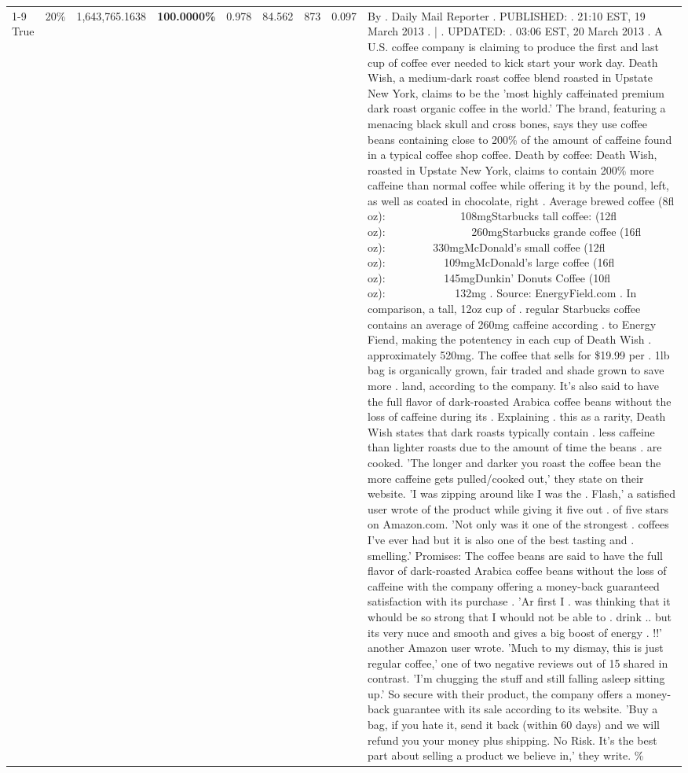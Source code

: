 \begin{table}[H]
{\begin{tabular}{lllrlllll}
\cline{1-9} \cline{2-9}
True & 20\% & 1,643,765.1638 & \bfseries \color{red} 100.0000\% & 0.978 & 84.562 & 873 & 0.097 & By . Daily Mail Reporter . PUBLISHED: . 21:10 EST, 19 March 2013 . | . UPDATED: . 03:06 EST, 20 March 2013 . A U.S. coffee company is claiming to produce the first and last cup of coffee ever needed to kick start your work day. Death Wish, a medium-dark roast coffee blend roasted in Upstate New York, claims to be the 'most highly caffeinated premium dark roast organic coffee in the world.' The brand, featuring a menacing black skull and cross bones, says they use coffee beans containing close to 200\% of the amount of caffeine found in a typical coffee shop coffee. Death by coffee: Death Wish, roasted in Upstate New York, claims to contain 200\% more caffeine than normal coffee while offering it by the pound, left, as well as coated in chocolate, right . Average brewed coffee (8fl oz):              108mgStarbucks tall coffee: (12fl oz):                260mgStarbucks grande coffee (16fl oz):         330mgMcDonald's small coffee (12fl oz):           109mgMcDonald's large coffee (16fl oz):           145mgDunkin' Donuts Coffee (10fl oz):             132mg . Source: EnergyField.com . In comparison, a tall, 12oz cup of . regular Starbucks coffee contains an average of 260mg caffeine according . to Energy Fiend, making the potentency in each cup of Death Wish . approximately 520mg. The coffee that sells for \$19.99 per . 1lb bag is organically grown, fair traded and shade grown to save more . land, according to the company. It's also said to have the full flavor of dark-roasted Arabica coffee beans without the loss of caffeine during its . Explaining . this as a rarity, Death Wish states that dark roasts typically contain . less caffeine than lighter roasts due to the amount of time the beans . are cooked. 'The longer and darker you roast the coffee bean the more caffeine gets pulled/cooked out,' they state on their website. 'I was zipping around like I was the . Flash,' a satisfied user wrote of the product while giving it five out . of five stars on Amazon.com. 'Not only was it one of the strongest . coffees I've ever had but it is also one of the best tasting and . smelling.’ Promises: The coffee beans are said to have the full flavor of dark-roasted Arabica coffee beans without the loss of caffeine with the company offering a money-back guaranteed satisfaction with its purchase . 'Ar first I . was thinking that it whould be so strong that I whould not be able to . drink .. but its very nuce and smooth and gives a big boost of energy . !!' another Amazon user wrote. 'Much to my dismay, this is just regular coffee,' one of two negative reviews out of 15 shared in contrast. 'I'm chugging the stuff and still falling asleep sitting up.' So secure with their product, the company offers a money-back guarantee with its sale according to its website. 'Buy a bag, if you hate it, send it back (within 60 days) and we will refund you your money plus shipping. No Risk. It’s the best part about selling a product we believe in,' they write. \% \\

\end{tabular}}
\end{table}
